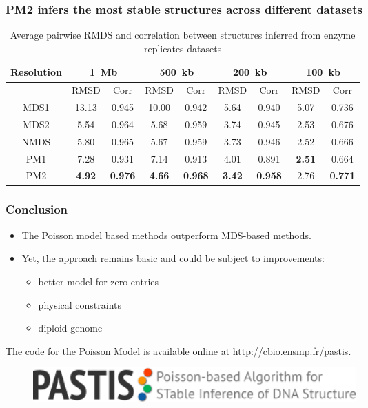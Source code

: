 \documentclass[xcolor=dvipsnames]{beamer}
\begin{document}
\begin{frame}
\frametitle{PM2 infers the most stable structures across different datasets}

{\scriptsize
\begin{table}
\begin{center}
\begin{tabular}{c | cc | cc | cc| cc}
\hline
Resolution & \multicolumn{2}{c}{1~Mb} & \multicolumn{2}{c}{500~kb} &
\multicolumn{2}{c}{200~kb} & \multicolumn{2}{c}{100~kb} \\
\hline
      &  RMSD & Corr  & RMSD  & Corr  & RMSD & Corr  & RMSD & Corr \\
\hline
MDS1  & 13.13 & 0.945 & 10.00 & 0.942 & 5.64 & 0.940 & 5.07 & 0.736 \\ 
MDS2  & 5.54  & 0.964 & 5.68  & 0.959 & 3.74 & 0.945 & 2.53 & 0.676 \\
NMDS  & 5.80  & 0.965 & 5.67  & 0.959 & 3.73 & 0.946 & 2.52 & 0.666 \\
PM1   & 7.28  & 0.931 & 7.14  & 0.913 & 4.01 & 0.891 & \textbf{2.51} & 0.664
\\
PM2   & \textbf{4.92} & \textbf{0.976} & \textbf{4.66} & \textbf{0.968} &
\textbf{3.42} & \textbf{0.958} & 2.76 & \textbf{0.771} \\
\hline
\end{tabular}
\end{center}
\caption{Average pairwise RMDS and correlation between structures inferred
from enzyme replicates datasets}
\end{table}
}
\end{frame}

\begin{frame}
\frametitle{Conclusion}
\begin{itemize}[label={$\bullet$}]

\item The Poisson model based methods outperform MDS-based methods.
\item Yet, the approach remains basic and could be subject to improvements:
  \begin{itemize}[label={$\bullet$}]

    \item better model for zero entries
    \item physical constraints
    \item diploid genome
  \end{itemize}
\end{itemize}

\vspace{3em}
{\footnotesize
The code for the Poisson Model is available online at
\url{http://cbio.ensmp.fr/pastis}.
}
\begin{figure}
\includegraphics[width=0.6\textwidth]{figures/pastis_logo.png}
\end{figure}
\end{frame}
\end{document}
